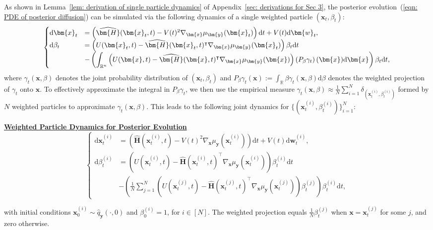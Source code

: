 \documentclass{article}
\numberwithin{equation}{section}
\def\eqref#1{(\ref{#1})}
\newcommand{\dif}{{\mathrm{d}}}
\def\vw{{\bm{w}}}
\def\vx{{\bm{x}}}
\def\vy{{\bm{y}}}
\def\mH{{\bm{H}}}
\begin{document}
As shown in Lemma~\ref{lem: derivation of single particle dynamics} of Appendix~\ref{sec: derivations for Sec 3}, the posterior evolution~\eqref{eqn: PDE of posterior diffusion} can be simulated via the following dynamics of a single weighted particle  $(\vx_t,\beta_t)$:
\begin{equation}
    \setlength{\abovedisplayskip}{3pt}
    \setlength{\belowdisplayskip}{3pt}
    \label{eqn: PDE soln via single particle} 
    \begin{cases}
    \dif \vx_t &= \left(\widehat{\mH}(\vx_t,t)-V(t)^2\nabla_{\vx}\mu_{\vy}(\vx_t)\right)\dif t + V(t)\dif \vw_t,\\
    \dif \beta_t &= \left(U(\vx_t,t) - \widehat{\mH}(\vx_t,t)^\intercal\nabla_{\vx}\mu_{\vy}(\vx_t)\right)\beta_t \dif t \\
    &- \left(\displaystyle\int_{\mathbb{R}^n}\left(U(\vx,t) - \widehat{\mH}(\vx,t)^\intercal\nabla_{\vx}\mu_{\vy}(\vx)\right)\left(P_{\beta}\gamma_t\right)(\vx)\dif \vx\right)\beta_t \dif t,    
    \end{cases}
\end{equation}
where $\gamma_t(\vx,\beta)$ denotes the joint probability distribution of $(\vx_t,\beta_t)$ and $P_{\beta}\gamma_t(\vx) := \int_{\mathbb{R}}\beta\gamma_t(\vx,\beta)\dif \beta$ denotes the weighted projection of $\gamma_t$ onto $\vx$. To effectively approximate the integral in $P_\beta \gamma_t$, we then use the empirical measure $\gamma_t(\vx,\beta) \approx \frac{1}{N}\sum_{i=1}^{N}\delta_{(\vx^{(i)}_t,\beta^{(i)}_t)}$ formed by $N$ weighted particles to approximate $\gamma_t(\vx,\beta)$. This leads to the following joint dynamics for $\{(\vx^{(i)}_t, \beta^{(i)}_t)\}_{i=1}^{N}$:
\begin{tcolorbox}[colback=lightgray,boxrule=0pt,sharp corners]
    \underline{\bfseries Weighted Particle Dynamics for Posterior Evolution}
    \begin{equation}
    \label{eqn: PDE soln via ensemble of particles} 
    \begin{cases}
    \dif \vx^{(i)}_t &= \left(\widehat{\mH}(\vx^{(i)}_t,t)-V(t)^2\nabla_{\vx}\mu_{\vy}(\vx^{(i)}_t)\right)\dif t + V(t)\dif \vw^{(i)}_t,\\
    \dif \beta^{(i)}_t &= \left(U(\vx^{(i)}_t,t) - \widehat{\mH}(\vx^{(i)}_t,t)^\intercal\nabla_{\vx}\mu_{\vy}(\vx^{(i)}_t)\right)\beta^{(i)}_t \dif t \\
    &- \left(\frac{1}{N}\sum_{j=1}^{N}\left(U(\vx^{(j)}_t,t) - \widehat{\mH}(\vx^{(j)}_t,t)^\intercal\nabla_{\vx}\mu_{\vy}(\vx^{(j)}_t)\right)\beta^{(j)}_t\right)\beta^{(i)}_t \dif t,  
    \end{cases}
    \end{equation}
\end{tcolorbox}
with initial conditions $\vx^{(i)}_0 \sim \widehat{q}_{\vy}(\cdot,0)$ and $\beta^{(i)}_0 = 1$, for $i \in [N]$. The weighted projection equals $\frac{1}{N}\beta^{(j)}_t$ when $\vx = \vx^{(j)}_t$ for some $j$, and zero otherwise.
\end{document}
